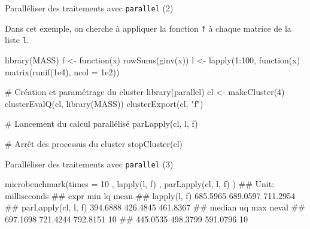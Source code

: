 \documentclass[12pt,ignorenonframetext,]{beamer}
\newenvironment{Shaded}{}{}
\newcommand{\KeywordTok}[1]{\textcolor[rgb]{0.00,0.00,1.00}{#1}}
\newcommand{\DataTypeTok}[1]{#1}
\newcommand{\DecValTok}[1]{#1}
\newcommand{\FloatTok}[1]{#1}
\newcommand{\StringTok}[1]{\textcolor[rgb]{0.00,0.50,0.50}{#1}}
\newcommand{\CommentTok}[1]{\textcolor[rgb]{0.00,0.50,0.00}{#1}}
\newcommand{\ControlFlowTok}[1]{\textcolor[rgb]{0.00,0.00,1.00}{#1}}
\newcommand{\OperatorTok}[1]{#1}
\newcommand{\NormalTok}[1]{#1}
\renewenvironment{Shaded}{\begin{snugshade}}{\end{snugshade}}
\begin{document}
\begin{frame}[fragile]{\large Paralléliser des traitements avec
\texttt{parallel} (2)}

Dans cet exemple, on cherche à appliquer la fonction \texttt{f} à chaque
matrice de la liste \texttt{l}.

\footnotesize

\begin{Shaded}
\begin{Highlighting}[]
\KeywordTok{library}\NormalTok{(MASS)}
\NormalTok{f <-}\StringTok{ }\ControlFlowTok{function}\NormalTok{(x) }\KeywordTok{rowSums}\NormalTok{(}\KeywordTok{ginv}\NormalTok{(x))}
\NormalTok{l <-}\StringTok{ }\KeywordTok{lapply}\NormalTok{(}\DecValTok{1}\OperatorTok{:}\DecValTok{100}\NormalTok{, }\ControlFlowTok{function}\NormalTok{(x) }\KeywordTok{matrix}\NormalTok{(}\KeywordTok{runif}\NormalTok{(}\FloatTok{1e4}\NormalTok{), }\DataTypeTok{ncol =} \FloatTok{1e2}\NormalTok{))}

\CommentTok{# Création et paramétrage du cluster}
\KeywordTok{library}\NormalTok{(parallel)}
\NormalTok{cl <-}\StringTok{ }\KeywordTok{makeCluster}\NormalTok{(}\DecValTok{4}\NormalTok{)}
\KeywordTok{clusterEvalQ}\NormalTok{(cl, }\KeywordTok{library}\NormalTok{(MASS))}
\KeywordTok{clusterExport}\NormalTok{(cl, }\StringTok{"f"}\NormalTok{)}

\CommentTok{# Lancement du calcul parallélisé}
\KeywordTok{parLapply}\NormalTok{(cl, l, f)}

\CommentTok{# Arrêt des processus du cluster}
\KeywordTok{stopCluster}\NormalTok{(cl)}
\end{Highlighting}
\end{Shaded}

\end{frame}

\begin{frame}[fragile]{\large Paralléliser des traitements avec
\texttt{parallel} (3)}

\begin{Shaded}
\begin{Highlighting}[]
\KeywordTok{microbenchmark}\NormalTok{(}\DataTypeTok{times =} \DecValTok{10}
\NormalTok{  , }\KeywordTok{lapply}\NormalTok{(l, f)}
\NormalTok{  , }\KeywordTok{parLapply}\NormalTok{(cl, l, f)}
\NormalTok{)}
\NormalTok{  ## Unit: milliseconds}
\NormalTok{  ##                 expr      min       lq     mean}
\NormalTok{  ##         lapply(l, f) 685.5965 689.0597 711.2954}
\NormalTok{  ##  parLapply(cl, l, f) 394.6888 426.4845 461.8367}
\NormalTok{  ##    median       uq      max neval}
\NormalTok{  ##  697.1698 721.4244 792.8151    10}
\NormalTok{  ##  445.0535 498.3799 591.0796    10}
\end{Highlighting}
\end{Shaded}

\end{frame}
\end{document}

